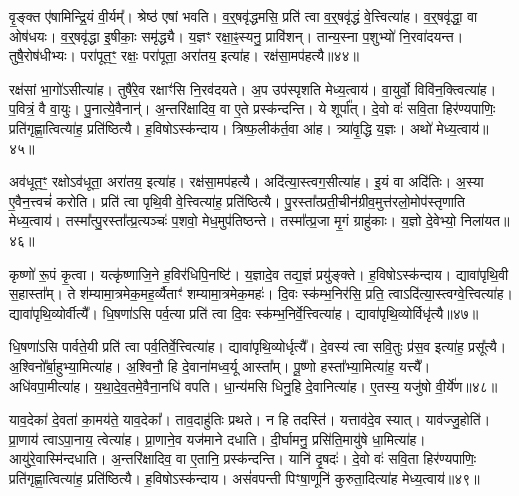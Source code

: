 वृ॒ङ्क्त ए॑षामिन्द्रि॒यं वी॒र्यम्᳚।
श्रेष्ठ॑ एषां भवति।
व॒र्॒षवृ॑द्धमसि॒ प्रति॑ त्वा व॒र्॒षवृ॑द्धं वे॒त्त्वित्या॑ह।
व॒र्॒षवृ॑द्धा॒ वा ओष॑धयः।
व॒र्॒षवृ॑द्धा इ॒षीकाः॒ समृ॑द्ध्यै।
य॒ज्ञꣳ रक्षा॒ꣴ॒स्यनु॒ प्रावि॑शन्।
तान्य॒स्ना प॒शुभ्यो॑ नि॒रवा॑दयन्त।
तुषै॒रोष॑धीभ्यः।
परा॑पूत॒ꣳ॒ रक्षः॒ परा॑पूता॒ अरा॑तय॒ इत्या॑ह।
रक्ष॑सा॒मप॑हत्यै॥४४॥

रक्ष॑सां भा॒गो॑\-ऽसीत्या॑ह।
तुषै॑रे॒व रक्षाꣳ॑सि नि॒रव॑दयते।
अ॒प उप॑स्पृशति मेध्य॒त्वाय॑।
वा॒युर्वो॒ विवि॑न॒क्त्वित्या॑ह।
प॒वित्रं॒ वै वा॒युः।
पु॒नात्ये॒वैनान्॑।
अ॒न्तरि॑क्षादिव॒ वा ए॒ते प्रस्क॑न्दन्ति।
ये शूर्पा᳚त्।
दे॒वो वः॑ सवि॒ता हिर॑ण्यपाणिः॒ प्रति॑\-गृह्णा॒त्वित्या॑ह॒ प्रति॑\-ष्ठित्यै।
ह॒विषो\-ऽस्क॑न्दाय।
त्रिष्फ॒लीक॑र्त॒वा आ॑ह।
त्र्या॑वृ॒द्धि य॒ज्ञः।
अथो॑ मेध्य॒त्वाय॑॥४५॥\anuvakamend[द्वाभ्या॒मुत्पु॑नाति र॒श्मयो॑ नय॒न्त्यग्रे॑ य॒ज्ञप॑तिं य॒ज्ञो\-ऽदि॑ति॒रस्क॑न्दाय गृह्णा॒मीत्या॑ह व॒देत्या॑ह॒ विजि॑त्या॒ अप॑हत्या॒ अस्क॑न्दाय॒ त्रीणि॑ च]

अव॑धूत॒ꣳ॒ रक्षो\-ऽव॑धूता॒ अरा॑तय॒ इत्या॑ह।
रक्ष॑सा॒मप॑हत्यै।
अदि॑त्या॒स्त्वग॒सीत्या॑ह।
इ॒यं वा अदि॑तिः।
अ॒स्या ए॒वैन॒त्त्वचं॑ करोति।
प्रति॑ त्वा पृथि॒वी वे॒त्त्वित्या॑ह॒ प्रति॑\-ष्ठित्यै।
पु॒रस्ता᳚त्प्रती॒चीन॑\-ग्रीव॒मुत्त॑र\-लो॒मोप॑स्तृणाति मेध्य॒त्वाय॑।
तस्मा᳚त्पु॒रस्ता᳚त्प्र॒त्यञ्चः॑ प॒शवो॒ मेध॒मुप॑तिष्ठन्ते।
तस्मा᳚त्प्र॒जा मृ॒गं ग्राहु॑काः।
य॒ज्ञो दे॒वेभ्यो॒ निला॑यत॥४६॥

कृष्णो॑ रू॒पं कृ॒त्वा।
यत्कृ॑ष्णाजि॒ने ह॒विर॑धिपि॒नष्टि॑।
य॒ज्ञादे॒व तद्य॒ज्ञं प्रयु॑ङ्क्ते।
ह॒विषो\-ऽस्क॑न्दाय।
द्यावा॑पृथि॒वी स॒हास्ता᳚म्।
ते श॑म्यामा॒त्रमेक॒मह॒र्व्यैताꣳ॑ शम्यामा॒त्रमेक॒महः॑।
दि॒वः स्क॑म्भ॒निर॑सि॒ प्रति॒ त्वा\-ऽदि॑त्या॒स्त्वग्वे॒त्त्वित्या॑ह।
द्यावा॑पृथि॒व्योर्वीत्यै᳚।
धि॒षणा॑ऽसि पर्व॒त्या प्रति॑ त्वा दि॒वः स्क॑म्भ॒निर्वे॒त्त्वित्या॑ह।
द्यावा॑पृथि॒व्योर्विधृ॑त्यै॥४७॥

धि॒षणा॑ऽसि पार्वते॒यी प्रति॑ त्वा पर्व॒तिर्वे॒त्त्वित्या॑ह।
द्यावा॑पृथि॒व्योर्धृत्यै᳚।
दे॒वस्य॑ त्वा सवि॒तुः प्र॑स॒व इत्या॑ह॒ प्रसू᳚त्यै।
अ॒श्विनो᳚र्बा॒हुभ्या॒मित्या॑ह।
अ॒श्विनौ॒ हि दे॒वाना॑मध्व॒र्यू आस्ता᳚म्।
पू॒ष्णो हस्ता᳚भ्या॒मित्या॑ह॒ यत्त्यै᳚।
अधि॑वपा॒मीत्या॑ह।
य॒था॒दे॒व॒तमे॒वैना॒नधि॑ वपति।
धा॒न्य॑मसि धिनु॒हि दे॒वानित्या॑ह।
ए॒तस्य॒ यजु॑षो वी॒र्ये॑ण॥४८॥

याव॒देका॑ दे॒वता॑ का॒मय॑ते॒ याव॒देका᳚।
ताव॒दाहु॑तिः प्रथते।
न हि तदस्ति॑।
यत्ताव॑दे॒व स्यात्।
याव॑ज्जु॒होति॑।
प्रा॒णाय॑ त्वा\-ऽपा॒नाय॒ त्वेत्या॑ह।
प्रा॒णाने॒व यज॑माने दधाति।
दी॒र्घामनु॒ प्रसि॑ति॒मायु॑षे धा॒मित्या॑ह।
आयु॑रे॒वास्मि॑न्दधाति।
अ॒न्तरि॑क्षादिव॒ वा ए॒तानि॒ प्रस्क॑न्दन्ति।
यानि॑ दृ॒षदः॑।
दे॒वो वः॑ सवि॒ता हिर॑ण्यपाणिः॒ प्रति॑\-गृह्णा॒त्वित्या॑ह॒ प्रति॑\-ष्ठित्यै।
ह॒विषो\-ऽस्क॑न्दाय।
असं॑वपन्ती पिꣳषा॒णूनि॑ कुरुता॒दित्या॑ह मेध्य॒त्वाय॑॥४९॥\anuvakamend[निला॑यत॒ विधृ॑त्यै वी॒र्ये॑ण स्कन्दन्ति च॒त्वारि॑ च]

